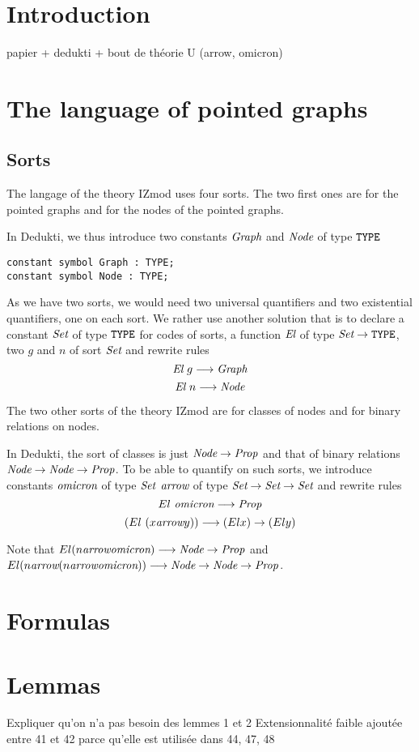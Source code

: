 \documentclass[a4paper]{article}
\begin{document}
\section{Introduction}

papier + dedukti + bout de théorie U (arrow, omicron)

\section{The language of pointed graphs}

\subsection{Sorts}

The langage of the theory IZmod uses four sorts. The two first ones
are for the pointed graphs and for the nodes of the pointed graphs.

In Dedukti, we thus introduce two constants ${\mbox{\it Graph}}$ and ${\mbox{\it Node}}$ of
type $\mbox{\tt TYPE}$
\begin{verbatim}
constant symbol Graph : TYPE;
constant symbol Node : TYPE;
\end{verbatim}
As we have two sorts, we would need two universal quantifiers and two 
existential quantifiers, one on each sort. 
We rather use another solution \cite{theoryU} that is to declare a constant
$\mbox{\it Set}$ of type $\mbox{\tt TYPE}$ for codes of sorts,
a function ${\mbox{\it El}}$ of type $\mbox{\it Set} \rightarrow \mbox{\tt TYPE}$, two 
$g$ and $n$ of sort $\mbox{\it Set}$ and rewrite rules 
$${\mbox{\it El}}~g \longrightarrow {\mbox{\it Graph}}$$
$${\mbox{\it El}}~n \longrightarrow {\mbox{\it Node}}$$

The two other sorts of the theory IZmod are for classes of nodes and
for binary relations on nodes.

In Dedukti, the sort of classes is just ${\mbox{\it Node}} \rightarrow {\mbox{\it Prop}}$ and that of
binary relations ${\mbox{\it Node}} \rightarrow {\mbox{\it Node}} \rightarrow {\mbox{\it Prop}}$. To be able to quantify on 
such sorts, we introduce constants ${\mbox{\it omicron}}$ of type $\mbox{\it Set}$ 
${\mbox{\it arrow}} $ of type
$\mbox{\it Set} \rightarrow \mbox{\it Set} \rightarrow \mbox{\it Set}$ 
and rewrite rules
$$El~{\mbox{\it omicron}} \longrightarrow {\mbox{\it Prop}}$$
$$(El~(x {\mbox{\it arrow}} y)) \longrightarrow (El x) \rightarrow (El y)$$

Note that $El (n {\mbox{\it arrow}} {\mbox{\it omicron}}) \longrightarrow {\mbox{\it Node}} \rightarrow {\mbox{\it Prop}}$ and 
$El (n {\mbox{\it arrow}} (n {\mbox{\it arrow}} {\mbox{\it omicron}})) \longrightarrow {\mbox{\it Node}} \rightarrow {\mbox{\it Node}} \rightarrow {\mbox{\it Prop}}$. 



\section{Formulas}

\section{Lemmas}

Expliquer qu'on n'a pas besoin des lemmes 1 et 2
Extensionnalité faible ajoutée entre 41 et 42 parce qu'elle est utilisée dans 44, 47, 48 
\end{document}

